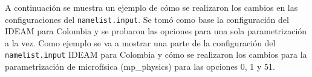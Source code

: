 \begin{itemize}

A continuación se muestra un ejemplo de cómo se realizaron los cambios en las configuraciones del \texttt{namelist.input}. Se tomó como base la configuración del IDEAM para Colombia y se probaron las opciones para una sola parametrización a la vez. Como ejemplo se va a mostrar una parte de la  configuración del \texttt{namelist.input} IDEAM para Colombia y cómo se realizaron los cambios para la parametrización de microfísica (mp\_physics) para las opciones 0, 1 y 51.\\


\end{itemize}
